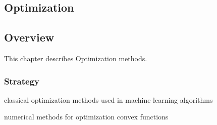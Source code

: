 

\renewcommand{\bibsection}{\subsection{\bibname}}
\begin{bibunit}

\chapter{Optimization}
\label{ch:optimization}

\section{Overview}
This chapter describes Optimization methods.


\subsection{Strategy}

classical optimization methods used in machine learning algorithms

numerical methods for optimization convex functions


\end{bibunit}
